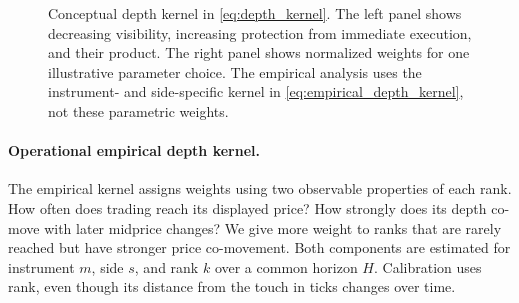 \documentclass[11pt]{article}
\begin{document}
\begin{figure}[htbp]
{%
    }
    \caption{Conceptual depth kernel in \cref{eq:depth_kernel}. The left panel shows decreasing visibility, increasing
    protection from immediate execution, and their product. The right panel shows normalized weights for one illustrative
    parameter choice. The empirical analysis uses the instrument- and side-specific kernel in
    \cref{eq:empirical_depth_kernel}, not these parametric weights.}
    \label{fig:depth_kernel_behavior}
\end{figure}

\paragraph{Operational empirical depth kernel.}
The empirical kernel assigns weights using two observable properties of each rank. How often does trading reach its displayed price? How strongly does its depth co-move with later midprice changes? We give more weight to ranks that are rarely reached but have stronger price co-movement. Both components are estimated for instrument $m$, side $s$, and rank $k$ over a common horizon $H$. Calibration uses rank, even though its distance from the touch in ticks changes over time.
\end{document}
